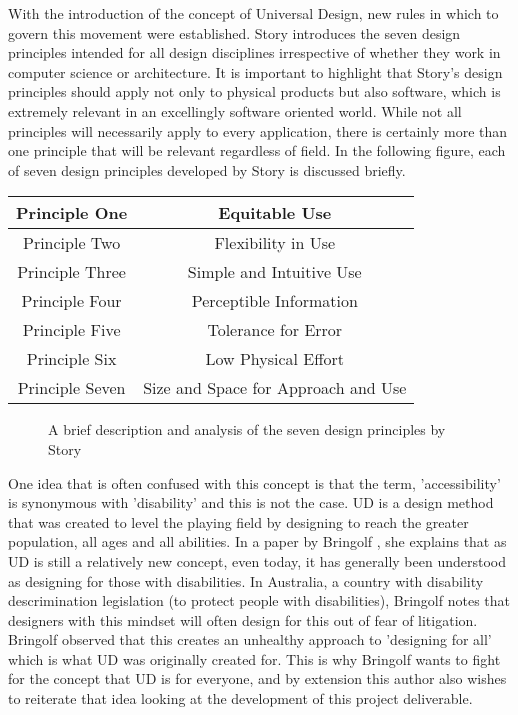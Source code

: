 With the introduction of the concept of Universal Design, new rules in which to govern this movement were established. %
Story introduces the seven design principles \cite{sevenprinciples} intended for all design disciplines irrespective of whether they work in computer science or architecture.
It is important to highlight that Story's design principles should apply not only to physical products but also software, which is extremely relevant in an excellingly software oriented world.
While not all principles will necessarily apply to every application, there is certainly more than one principle that will be relevant regardless of field.
In the following figure, each of seven design principles developed by Story is discussed briefly.

\begin{center}
    \begin{tabular}{ |c|c| } 
     \hline
     Principle One & Equitable Use \\
     \hline
     Principle Two & Flexibility in Use \\ 
     \hline
     Principle Three & Simple and Intuitive Use \\ 
     \hline
     Principle Four & Perceptible Information \\
     \hline 
     Principle Five & Tolerance for Error \\ 
     \hline
     Principle Six & Low Physical Effort \\ 
     \hline
     Principle Seven & Size and Space for Approach and Use \\
     \hline
    \end{tabular}
\end{center}

\begin{figure}
    \caption{A brief description and analysis of the seven design principles by Story\cite{sevenprinciples}}
    \label{fig:DesignPrinciples}
\end{figure}

One idea that is often confused with this concept is that the term, 'accessibility' is synonymous with 'disability' and this is not the case.
UD is a design method that was created to level the playing field by designing to reach the greater population, all ages and all abilities.
In a paper by Bringolf \cite{accessible}, she explains that as UD is still a relatively new concept, even today, it has generally been understood as designing for those with disabilities.
In Australia, a country with disability descrimination legislation (to protect people with disabilities), Bringolf notes that designers with this mindset will often design for this out of fear of litigation.
Bringolf observed that this creates an unhealthy approach to 'designing for all' which is what UD was originally created for. %
This is why Bringolf wants to fight for the concept that UD is for everyone, and by extension this author also wishes to reiterate that idea looking at the development of this project deliverable. %

